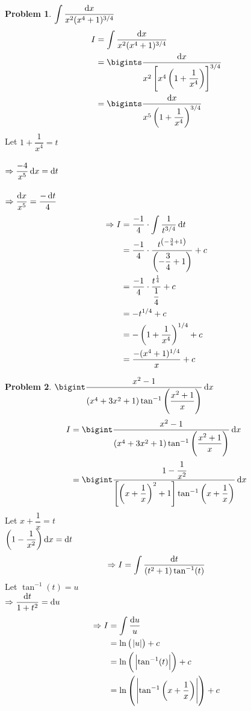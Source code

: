 \documentclass[14]{article}
\theoremstyle{definition}
\newtheorem{prob}{Problem}
\theoremstyle{case}
\begin{document}
\begin{prob}
$\displaystyle \int \dfrac{\dif x}{x^2 (x^4 + 1)^{3/4}}$
\begin{align*}
I &= \int \dfrac{\dif x}{x^2 (x^4 + 1)^{3/4}}\\
&= \bigints \dfrac{\dif x}{x^2 \left[ x^4 \left(1 + \dfrac1{x^4} \right) \right]^{3/4}}\\
&= \bigints \dfrac{\dif x}{x^5 \left(1 + \dfrac1{x^4} \right)^{3/4}}
\end{align*}
Let $1 + \dfrac1{x^4} = t$\\\\
$\Rightarrow\dfrac{-4}{x^5} \dif x = \dif t$\\\\
$\Rightarrow \dfrac{\dif x}{x^5} = \dfrac{-\dif t}{4}$
\begin{align*}
\Rightarrow I &= \dfrac{-1}{4} \cdot \int \dfrac{1}{t^{3/4}} \dif t\\
&= \dfrac{-1}4 \cdot \dfrac{t^{\left(-\frac34 + 1\right)}}{\left(-\dfrac34 + 1\right)}+c\\
&= \dfrac{-1}4 \cdot \dfrac{t^{\frac14}}{\dfrac14}+c\\
&= -t^{1/4}+c\\
&= - \left(1 + \dfrac1{x^4} \right)^{1/4}+c\\
&= \dfrac{-(x^4 + 1)^{1/4}}{x}+c
\end{align*}
\end{prob}
\pagebreak
\begin{prob}
$\displaystyle \bigint \dfrac{x^2 - 1}{(x^4 + 3x^2 + 1) \tan^{-1} \left( \dfrac{x^2 + 1}{x} \right)} \dif x$
\begin{align*}
I &= \bigint \dfrac{x^2 - 1}{(x^4 + 3x^2 + 1) \tan^{-1} \left( \dfrac{x^2 + 1}{x} \right)} \dif x\\
&= \bigint \dfrac{1 - \cfrac1{x^2}}{\left[ \left( x + \dfrac1x \right)^2 + 1 \right] \tan^{-1} \left( x + \dfrac1x \right)} \dif x
\end{align*}
Let $x + \dfrac1x = t$\\
$\left( 1 - \dfrac1{x^2} \right) \dif x = \dif t$\\
\[
\Rightarrow I = \int \dfrac{\dif t}{(t^2 + 1) \tan^{-1}(t)}
\]
Let $\tan^{-1} (t) = u$\\
$\Rightarrow \dfrac{\dif t}{1 + t^2} = \dif u$\\
\begin{align*}
\Rightarrow I &= \int \dfrac{\dif u}{u}\\
&= \ln\left(\; \abs{u} \right) + c\\
&= \ln\left(\; \abs{\tan^{-1}(t)} \right) + c\\
&= \ln\left(\; \abs{\tan^{-1}\left(x + \dfrac1x\right)} \right) + c
\end{align*}
\end{prob}
\end{document}
